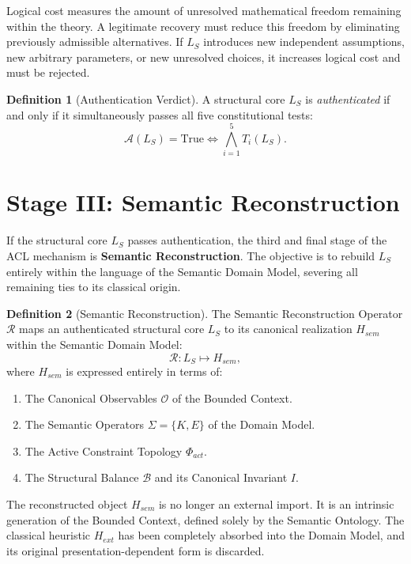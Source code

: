 \documentclass[12pt,openany]{extbook}
\theoremstyle{plain}
\theoremstyle{definition}
\newtheorem{definition}{Definition}[chapter]
\begin{document}
Logical cost measures the amount of unresolved mathematical freedom remaining within the theory. A legitimate recovery must reduce this freedom by eliminating previously admissible alternatives. If $L_S$ introduces new independent assumptions, new arbitrary parameters, or new unresolved choices, it increases logical cost and must be rejected.

\begin{definition}[Authentication Verdict]
A structural core $L_S$ is \emph{authenticated} if and only if it simultaneously passes all five constitutional tests:
\[
\mathcal{A}(L_S) = \text{True} \iff \bigwedge_{i=1}^{5} T_i(L_S).
\]
\end{definition}

\section{Stage III: Semantic Reconstruction}

If the structural core $L_S$ passes authentication, the third and final stage of the ACL mechanism is \textbf{Semantic Reconstruction}. The objective is to rebuild $L_S$ entirely within the language of the Semantic Domain Model, severing all remaining ties to its classical origin.

\begin{definition}[Semantic Reconstruction]
The Semantic Reconstruction Operator $\mathcal{R}$ maps an authenticated structural core $L_S$ to its canonical realization $H_{sem}$ within the Semantic Domain Model:
\[
\mathcal{R}: L_S \longmapsto H_{sem},
\]
where $H_{sem}$ is expressed entirely in terms of:
\begin{enumerate}
    \item The Canonical Observables $\mathcal{O}$ of the Bounded Context.
    \item The Semantic Operators $\Sigma = \{K, E\}$ of the Domain Model.
    \item The Active Constraint Topology $\Phi_{act}$.
    \item The Structural Balance $\mathcal{B}$ and its Canonical Invariant $I$.
\end{enumerate}
\end{definition}

The reconstructed object $H_{sem}$ is no longer an external import. It is an intrinsic generation of the Bounded Context, defined solely by the Semantic Ontology. The classical heuristic $H_{ext}$ has been completely absorbed into the Domain Model, and its original presentation-dependent form is discarded.
\end{document}
